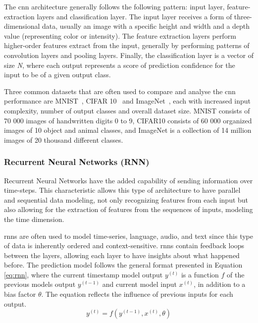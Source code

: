 The \acrshort{cnn} architecture generally follows the following pattern: input layer, feature-extraction layers and classification layer. The input layer receives a form of three-dimensional data, usually an image with a specific height and width and a depth value (representing color or intensity). The feature extraction layers perform higher-order features extract from the input, generally by performing patterns of convolution layers and pooling layers. Finally, the classification layer is a vector of size \textit{N}, where each output represents a score of prediction confidence for the input to be of a given output class.

Three common datasets that are often used to compare and analyse the \acrshort{cnn}  performance are MNIST~\cite{lecun_yann_and_cortes_corinna_mnist_1999}, CIFAR 10~\cite{krizhevsky_learning_2009} and ImageNet~\cite{deng_imagenet_2009}, each with increased input complexity, number of output classes and overall dataset size. MNIST consists of 70 000 images of handwritten digits 0 to 9, CIFAR10 consists of 60 000 organized images of 10 object and animal classes, and ImageNet is a collection of 14 million images of 20 thousand different classes. 

\subsubsection{Recurrent Neural Networks (RNN)}

Recurrent Neural Networks have the added capability of sending information over time-steps. This characteristic allows this type of architecture to have parallel and sequential data modeling, not only recognizing features from each input but also allowing for the extraction of features from the sequences of inputs, modeling the time dimension. 

\acrshort{rnn}s are often used to model time-series, language, audio, and text since this type of data is inherently ordered and context-sensitive. \acrshort{rnn}s contain feedback loops between the layers, allowing each layer to have insights about what happened before. The prediction model follows the general format presented in Equation \ref{eq:rnn}, where the current timestamp model output $y^{(t)}$ is a function $f$ of the previous models output $y^{(t-1)}$ and current model input $x^{(t)}$, in addition to a bias factor $\theta$. The equation reflects the influence of previous inputs for each output.
\begin{equation}
    \label{eq:rnn}
    y^{(t)}=f(y^{(t-1)}, x^{(t)}, \theta)
\end{equation}

